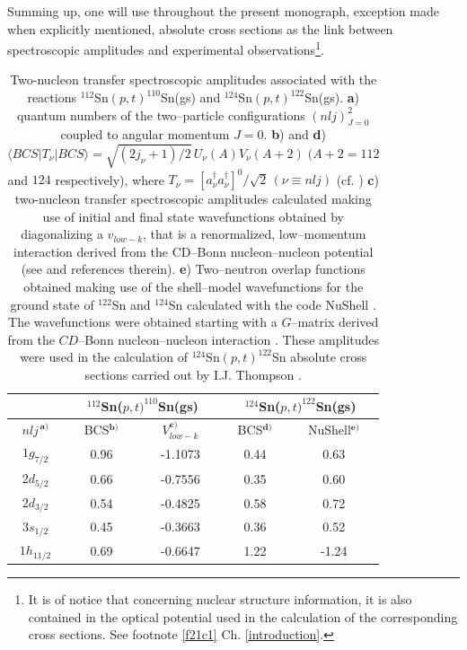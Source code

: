 Summing up, one will use throughout the present monograph, exception made when explicitly mentioned, absolute cross sections as the  link between spectroscopic amplitudes and experimental observations\footnote{It is of notice that concerning nuclear structure information, it is also contained in the optical potential used in the calculation of the corresponding cross sections. See footnote \ref{f21c1} Ch. \ref{introduction}.}.
 \begin{table}[h!]
	{\begin{tabular}{|c|c|c|c|c|}
			\cline{2-5} 
			\multicolumn{1}{c|}{ }& \multicolumn{2}{|c|}{ $^{112}$Sn($p,t)^{110}$Sn(gs)}&\multicolumn{2}{|c|}{$^{124}$Sn($p,t)^{122}$Sn(gs)} \\
			\hline
			$nlj^{\,\mathbf a)}$ & BCS$^{\mathbf b)}$ & $V_{low-k}^{\mathbf c)}$ & BCS$^{\mathbf d)}$& NuShell$^{\mathbf e)}$  \\
			\hline
			$1g_{7/2}$ & 0.96 &-1.1073 & 0.44 & 0.63  \\
			$2d_{5/2}$ & 0.66 & -0.7556& 0.35 & 0.60  \\
			$2d_{3/2}$ & 0.54 &  -0.4825& 0.58 & 0.72  \\
			$3s_{1/2}$ & 0.45 &  -0.3663&  0.36 & 0.52  \\
			$1h_{11/2}$ & 0.69 & -0.6647 & 1.22 & -1.24  \\
			\hline 
	\end{tabular}}
	\caption{ Two-nucleon transfer spectroscopic amplitudes associated with the reactions $^{112}$Sn$(p,t)^{110}$Sn(gs) and $^{124}$Sn$(p,t)^{122}$Sn(gs). \textbf{a}) quantum numbers of the two--particle configurations $(nlj)^2_{J=0}$ coupled to angular momentum $J=0$. \textbf{b}) and \textbf{d}) $\langle BCS|T_\nu|BCS\rangle=\sqrt{(2j_\nu+1)/2}\,U_\nu(A) V_\nu(A+2)\;(A+2=112$ and $ 124$ respectively), where $T_\nu=[a^\dagger_{\nu}a^\dagger_\nu]^0/\sqrt{2} \,(\nu\equiv nlj)$ (cf. \cite{Potel:11,Potel:13,Potel:13b}) \textbf{c}) two-nucleon transfer spectroscopic amplitudes calculated making use of initial and final state wavefunctions obtained by diagonalizing a $v_{low-k}$, that is a renormalized, low--momentum interaction derived from the CD--Bonn nucleon--nucleon potential (see \cite{Guazzoni:06} and references therein). \textbf{e}) Two--neutron overlap functions obtained making use of the shell--model wavefunctions for the ground state of $^{122}$Sn and $^{124}$Sn calculated with the code NuShell \citep{Brown:07}. The wavefunctions were obtained starting with a $G$--matrix derived from the $CD$--Bonn nucleon--nucleon interaction \cite{Machleidt:96}. These amplitudes were used in the calculation of $^{124}$Sn$(p,t)^{122}$Sn absolute cross sections carried out by I.J. Thompson \citep{Thompson:13}. }\label{tab1D1}
\end{table}


